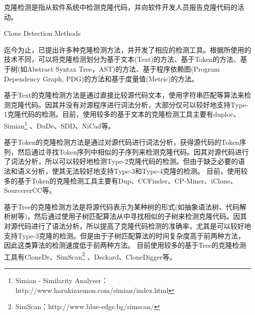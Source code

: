 克隆检测是指从软件系统中检测克隆代码，并向软件开发人员报告克隆代码的活动。

{Clone Detection Methods}


迄今为止，已提出许多种克隆检测方法，并开发了相应的检测工具。根据所使用的技术不同，可以将克隆检测划分为基于文本(Text)的方法、基于Token的方法、基于树(如Abstract Syntax Tree，AST)的方法、基于程序依赖图(Program Dependency Graph, PDG)的方法和基于度量值(Metric)的方法。

基于Text的克隆检测方法是通过直接比较源代码文本，使用字符串匹配等算法来检测克隆代码。因其并没有对源程序进行词法分析，大部分仅可以较好地支持Type-1克隆代码的检测。目前，使用较多的基于文本的克隆检测工具主要有duploc\cite{ducasse1999language}、Simian\footnote{Simian - Similarity Analyser：http://www.harukizaemon.com/simian/index.html}%
、DuDe\cite{wettel2005archeology}、SDD\cite{lee2005sdd}、NiCad\cite{roy2008nicad}等。

基于Token的克隆检测方法是通过对源代码进行词法分析，获得源代码的Token序列，然后通过寻找Token序列中相似的子序列来检测克隆代码。因其对源代码进行了词法分析，所以可以较好地检测Type-2克隆代码的检测。但由于缺乏必要的语法和语义分析，使其无法较好地支持Type-3和Type-4克隆的检测。
目前，使用较多的基于Token的克隆检测工具主要有Dup\cite{baker1995finding}、CCFinder\cite{kamiya2002ccfinder}、CP-Miner\cite{li2006cp}、iClone\cite{gode2009incremental}、SourcererCC\cite{sajnani2016sourcerercc}等。

基于Tree的克隆检测方法是将源代码表示为某种树的形式(如抽象语法树、代码解析树等)，然后通过使用子树匹配算法从中寻找相似的子树来检测克隆代码。因其对源代码进行了语法分析，所以提高了克隆代码检测的准确率，尤其是可以较好地支持Type-3克隆的检测。但是由于子树匹配算法的时间复杂度高于前两种方法，因此这类算法的检测速度低于前两种方法。
目前使用较多的基于Tree的克隆检测工具有CloneDr\cite{baxter1998clone}、SimScan\footnote{SimScan：http://www.blue-edge.bg/simscan/}%
、Deckard\cite{jiang2007deckard}、CloneDigger\cite{bulychev2008duplicate}等。


